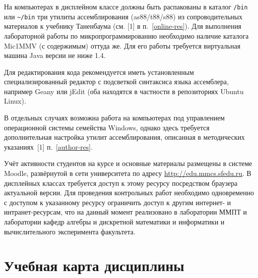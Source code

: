 На компьютерах в дисплейном классе должны быть распакованы в каталог \texttt{/bin} или \texttt{\textasciitilde/bin} три утилиты ассемблирования (as88/t88/s88) из сопроводительных материалов к учебнику Таненбаума (см. [1] в п.~\ref{online-res}). Для выполнения лабораторной работы по микропрограммированию необходимо наличие каталога Mic1MMV (с содержимым) оттуда же. Для его работы требуется виртуальная машина Java версии не ниже 1.4.

Для редактирования кода рекомендуется иметь установленным специализированный редактор с подсветкой синтаксиса языка ассемблера, например Geany или jEdit (оба находятся в частности в репозиториях Ubuntu Linux).

В отдельных случаях возможна работа на компьютерах под управлением операционной системы семейства Windows, однако здесь требуется дополнительная настройка утилит ассемблирования, описанная в методических указаниях~[1] п.~\ref{author-res}.



Учёт активности студентов на курсе и основные материалы размещены в системе Moodle, развёрнутой в сети университета по адресу \url{http://edu.mmcs.sfedu.ru}. В дисплейных классах требуется доступ к этому ресурсу посредством браузера актуальной версии. Для проведения контрольных работ необходимо одновременно с доступом к указанному ресурсу ограничить доступ к другим интернет- и интранет-ресурсам, что на данный момент реализовано в лаборатории ММПТ и лаборатории кафедр алгебры и дискретной математики и информатики и вычислительного эксперимента факультета.

\clearpage
\section{Учебная карта дисциплины}

% 
% 


